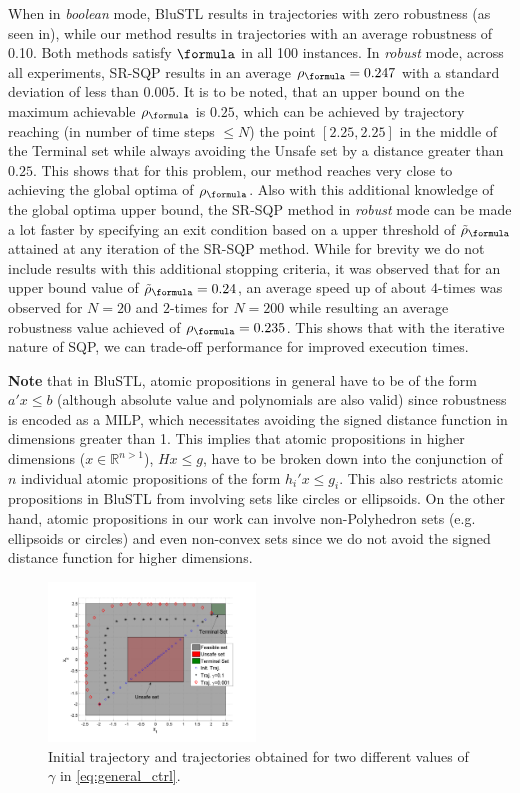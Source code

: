 When in \textit{boolean} mode, BluSTL results in trajectories with zero robustness (as seen in), while our method results in trajectories with an average robustness of 0.10. Both methods satisfy $\formula$ in all 100 instances. In \textit{robust} mode, across all experiments, SR-SQP results in an average $\rob_{\formula}=0.247$ with a standard deviation of less than $0.005$. It is to be noted, that an upper bound on the maximum achievable $\rob_{\formula}$ is $0.25$, which can be achieved by trajectory reaching (in number of time steps $\leq N$) the point $[2.25,2.25]$ in the middle of the Terminal set while always avoiding the Unsafe set by a distance greater than $0.25$. This shows that for this problem, our method reaches very close to achieving the global optima of $\rob_{\formula}$. Also with this additional knowledge of the global optima upper bound, the SR-SQP method in \textit{robust} mode can be made a lot faster by specifying an exit condition based on a upper threshold of $\srob_{\formula}$ attained at any iteration of the SR-SQP method. While for brevity we do not include results with this additional stopping criteria, it was observed that for an upper bound value of $\srob_{\formula}=0.24$, an average speed up of about $4$-times was observed for $N=20$ and $2$-times for $N=200$ while resulting an average robustness value achieved of $\rob_{\formula} = 0.235$. This shows that with the iterative nature of SQP, we can trade-off performance for improved execution times.

\textbf{Note} that in BluSTL, atomic propositions in general have to be of the form $a'x\leq b$ (although absolute value and polynomials are also valid) since robustness is encoded as a MILP, which necessitates avoiding the signed distance function in dimensions greater than 1. This implies that atomic propositions in higher dimensions ($x\in \mathbb{R}^{n>1}$), $Hx \leq g$, have to be broken down into the conjunction of $n$ individual atomic propositions of the form $h_i'x \leq g_i$. This also restricts atomic propositions in BluSTL from involving sets like circles or ellipsoids. On the other hand, atomic propositions in our work can involve non-Polyhedron sets (e.g. ellipsoids or circles) and even non-convex sets since we do not avoid the signed distance function for higher dimensions.

\begin{figure}[t]
\centering
\includegraphics[width=0.49\textwidth]{figures/ToyExampleControl}
\vspace{-30pt}
\caption{{\small Initial trajectory and trajectories obtained for two different values of $\gamma$ in \eqref{eq:general_ctrl}.}}
\label{fig:toy control}
\vspace{-10pt}
\end{figure}
